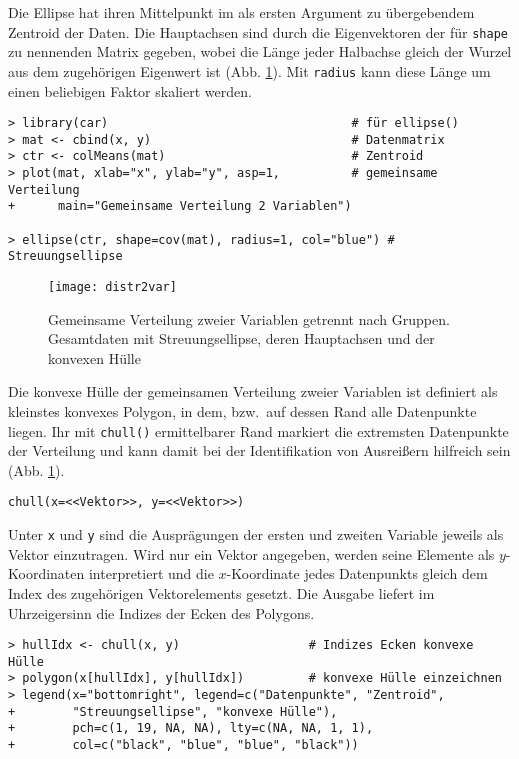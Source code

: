 Die Ellipse hat ihren Mittelpunkt im als ersten Argument zu übergebendem Zentroid der Daten. Die Hauptachsen sind durch die Eigenvektoren der für \lstinline!shape! zu nennenden Matrix gegeben, wobei die Länge jeder Halbachse gleich der Wurzel aus dem zugehörigen Eigenwert ist (Abb. \ref{fig:distr2var}). Mit \lstinline!radius! kann diese Länge um einen beliebigen Faktor skaliert werden.
\begin{lstlisting}
> library(car)                                  # für ellipse()
> mat <- cbind(x, y)                            # Datenmatrix
> ctr <- colMeans(mat)                          # Zentroid
> plot(mat, xlab="x", ylab="y", asp=1,          # gemeinsame Verteilung
+      main="Gemeinsame Verteilung 2 Variablen")

> ellipse(ctr, shape=cov(mat), radius=1, col="blue") # Streuungsellipse
\end{lstlisting}

\begin{figure}[ht]
\centering
\texttt{[image: distr2var]}
\vspace*{-1em}
\caption{Gemeinsame Verteilung zweier Variablen getrennt nach Gruppen. Gesamtdaten mit Streuungsellipse, deren Hauptachsen und der konvexen Hülle}
\label{fig:distr2var}
\end{figure}

Die konvexe Hülle der gemeinsamen Verteilung zweier Variablen ist definiert als kleinstes konvexes Polygon, in dem, bzw.\ auf dessen Rand alle Datenpunkte liegen. Ihr mit \lstinline!chull()! ermittelbarer Rand markiert die extremsten Datenpunkte der Verteilung und kann damit bei der Identifikation von Ausreißern hilfreich sein (Abb. \ref{fig:distr2var}).
\begin{lstlisting}
chull(x=<<Vektor>>, y=<<Vektor>>)
\end{lstlisting}

Unter \lstinline!x! und \lstinline!y! sind die Ausprägungen der ersten und zweiten Variable jeweils als Vektor einzutragen. Wird nur ein Vektor angegeben, werden seine Elemente als $y$-Koordinaten interpretiert und die $x$-Koordinate jedes Datenpunkts gleich dem Index des zugehörigen Vektorelements gesetzt. Die Ausgabe liefert im Uhrzeigersinn die Indizes der Ecken des Polygons.
\begin{lstlisting}
> hullIdx <- chull(x, y)                  # Indizes Ecken konvexe Hülle
> polygon(x[hullIdx], y[hullIdx])         # konvexe Hülle einzeichnen
> legend(x="bottomright", legend=c("Datenpunkte", "Zentroid",
+        "Streuungsellipse", "konvexe Hülle"),
+        pch=c(1, 19, NA, NA), lty=c(NA, NA, 1, 1),
+        col=c("black", "blue", "blue", "black"))
\end{lstlisting}

